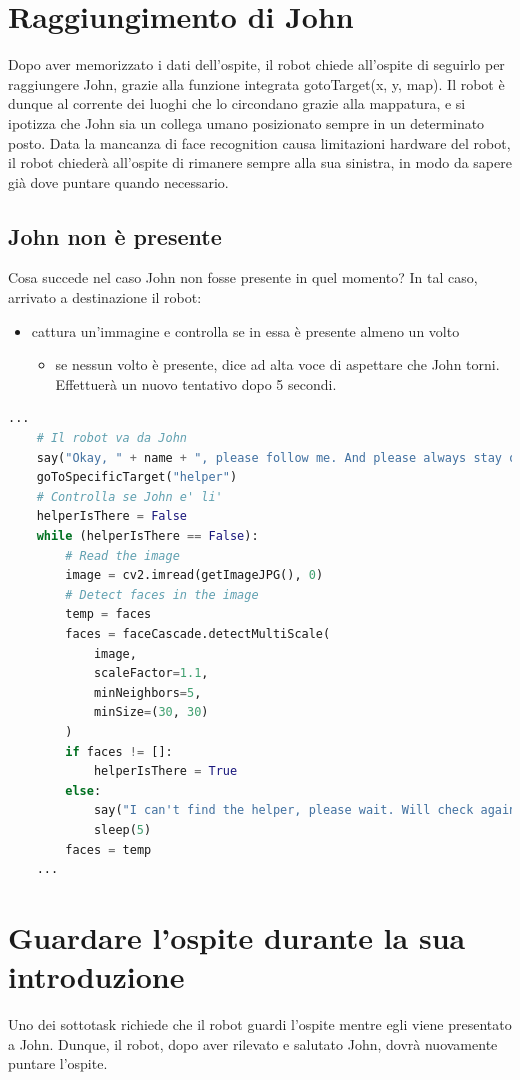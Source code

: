 \documentclass[italian, twoside]{sapthesis} %
\begin{document}
\section{Raggiungimento di John}
Dopo aver memorizzato i dati dell'ospite, il robot chiede all'ospite di seguirlo per raggiungere John, grazie alla funzione integrata gotoTarget(x, y, map). Il robot è dunque al corrente dei luoghi che lo circondano grazie alla mappatura, e si ipotizza che John sia un collega umano posizionato sempre in un determinato posto. Data la mancanza di face recognition causa limitazioni hardware del robot, il robot chiederà all'ospite di rimanere sempre alla sua sinistra, in modo da sapere già dove puntare quando necessario.

\subsection{John non è presente}
Cosa succede nel caso John non fosse presente in quel momento? In tal caso, arrivato a destinazione il robot:

\begin{itemize}
    \item cattura un'immagine e controlla se in essa è presente almeno un volto
	\begin{itemize}
        \item se nessun volto è presente, dice ad alta voce di aspettare che John torni. Effettuerà un nuovo tentativo dopo 5 secondi.
    \end{itemize}
\end{itemize}

\begin{lstlisting}[language=Python]
    ...
    # Il robot va da John
    say("Okay, " + name + ", please follow me. And please always stay on my left.")
    goToSpecificTarget("helper")
    # Controlla se John e' li'
    helperIsThere = False
    while (helperIsThere == False):
        # Read the image
        image = cv2.imread(getImageJPG(), 0)
        # Detect faces in the image
        temp = faces
        faces = faceCascade.detectMultiScale(
            image,
            scaleFactor=1.1,
            minNeighbors=5,
            minSize=(30, 30)
        )
        if faces != []:
            helperIsThere = True
        else:
            say("I can't find the helper, please wait. Will check again in 5 seconds.")
            sleep(5)
        faces = temp
    ...
\end{lstlisting}

\section{Guardare l'ospite durante la sua introduzione}
Uno dei sottotask richiede che il robot guardi l'ospite mentre egli viene presentato a John. Dunque, il robot, dopo aver rilevato e salutato John, dovrà nuovamente puntare l'ospite.
\end{document}

